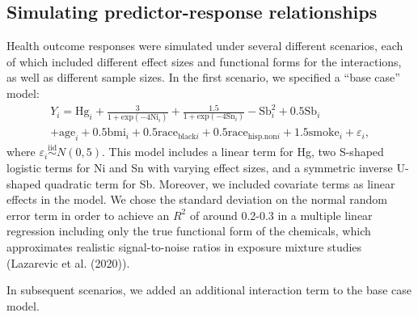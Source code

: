 \documentclass[12pt, twoside]{amherstthesis}
\begin{document}
\hypertarget{simresp}{%
\subsection{Simulating predictor-response relationships}\label{simresp}}

Health outcome responses were simulated under several different scenarios, each of which included different effect sizes and functional forms for the interactions, as well as different sample sizes. In the first scenario, we specified a ``base case'' model:
\begin{multline*}
Y_i = \textrm{Hg}_i + \frac{3}{1+\textrm{exp}(-4\textrm{Ni}_i)} + \frac{1.5}{1+\textrm{exp}(-4\textrm{Sn}_i)} - \textrm{Sb}_i^2 + 0.5\textrm{Sb}_i\\
+ \textrm{age}_i + 0.5\textrm{bmi}_i + 0.5\textrm{race}_{\textrm{black}i} + 0.5\textrm{race}_{\textrm{hisp.non}i} + 1.5\textrm{smoke}_i + \varepsilon_i,
\end{multline*}
\noindent where \(\varepsilon_i \overset{\mathrm{iid}}{\sim} N(0,5)\). This model includes a linear term for Hg, two S-shaped logistic terms for Ni and Sn with varying effect sizes, and a symmetric inverse U-shaped quadratic term for Sb. Moreover, we included covariate terms as linear effects in the model. We chose the standard deviation on the normal random error term in order to achieve an \(R^2\) of around 0.2-0.3 in a multiple linear regression including only the true functional form of the chemicals, which approximates realistic signal-to-noise ratios in exposure mixture studies (Lazarevic et al. (2020)).

In subsequent scenarios, we added an additional interaction term to the base case model.
\end{document}

